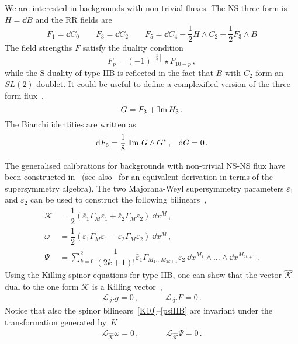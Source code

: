 \documentclass[debug]{phd}
\begin{document}
We are interested in backgrounds with non trivial fluxes. The NS three-form is $H = \dd  B$ and the RR fields are 
%
	\begin{equation} 
	 F_1=\dd  C_0 \qquad 
	 F_3=\dd  C_2 \qquad 
	 F_5=\dd  C_4 - \frac{1}{2} H \wedge C_2 + \frac{1}{2} F_3 \wedge B
	\end{equation} 
%	
The field strengths $F$ satisfy the duality condition
%
	\begin{equation} 
	\label{fdual}
		F_p = (-1)^{\left[\tfrac{p}{2}\right]} \star F_{10-p}\, , 
	\end{equation} 
%
while the S-duality of type IIB is reflected in the fact that $B$ with $C_2$ form an $SL(2)$ doublet. It could be useful to define a complexified version of the three-form flux~\cite{Schwarz:1983qr},
%
	\begin{equation} 
		G = F_3 + \operatorname{\mathbb{I}m} H_3\, .
	\end{equation} 
%
The Bianchi identities are written as
%
	\begin{align}
		& &	\mathrm{d}  F_5= \frac{1}{8}\, \operatorname{\mathbb{I}m}\, G\wedge G^*\, ,
			& & 
		\mathrm{d}  G= 0\, . & & 
	\end{align}
%

The generalised calibrations for backgrounds with non-trivial NS-NS flux have been constructed in~\cite{Martucci:2011dn} (see also~\cite{Cascales:2004qp, HPS04} for an equivalent derivation in terms of the supersymmetry algebra). 
%
The two Majorana-Weyl supersymmetry parameters $\varepsilon_1$ and $\varepsilon_2$ can be used to construct the following bilinears~\cite{BJRT99},
%
	\begin{align}
		\label{K10}
		\mathcal{K} &= \dfrac{1}{2} ( \bar{\varepsilon}_1 \Gamma_M \varepsilon_1 + \bar{\varepsilon}_2 \Gamma_M \varepsilon_2)\ \dd  x^M\, , \\
		\label{omega10}
		\omega &= \dfrac{1}{2} ( \bar{\varepsilon}_1 \Gamma_M \varepsilon_1 - \bar{\varepsilon}_2 \Gamma_M \varepsilon_2)\ \dd  x^M\, , \\
		\label{psiIIB}
		\Psi &= \sum_{k=0}^2 \dfrac{1}{(2 k+ 1)!} \bar{\varepsilon}_1 \Gamma_{M_1 \ldots M_{2k +1} } \varepsilon_2 \ \dd  x^{M_1} \wedge \ldots \wedge \dd  x^{M_{2k +1}} \, . 
	\end{align}
%
Using the Killing spinor equations for type IIB, one can show that the vector $\hat{\mathcal{K}}$ dual to the one form $\mathcal{K}$ is a Killing vector~\cite{Tomasiello:2011eb},
%
	\begin{equation} 
		\begin{array}{ccc}
			\mathcal{L}_{\hat{\mathcal{K}}} g = 0\, ,& \phantom{and}& \mathcal{L}_{\hat{\mathcal{K}}} F = 0 \, . 
		\end{array}
	\end{equation} 
%
Notice that also the spinor bilinears~\eqref{K10}--\eqref{psiIIB} are invariant under the transformation generated by~$\hat{K}$
%
	\begin{equation} 
		\begin{array}{ccc}
			\mathcal{L}_{\hat{\mathcal{K}}} \omega = 0\, , & \phantom{and} & \mathcal{L}_{\hat{\mathcal{K}}} \Psi = 0 \, .
		\end{array}
	\end{equation} 
%
\end{document}
